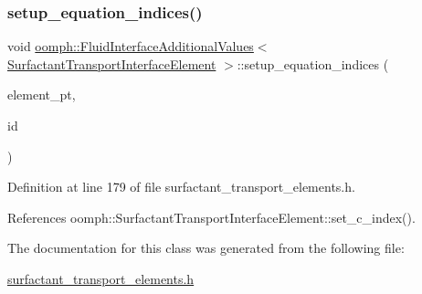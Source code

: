 \subsubsection{\texorpdfstring{setup\+\_\+equation\+\_\+indices()}{setup\_equation\_indices()}}
{\footnotesize\ttfamily void \hyperlink{classoomph_1_1FluidInterfaceAdditionalValues}{oomph\+::\+Fluid\+Interface\+Additional\+Values}$<$ \hyperlink{classoomph_1_1SurfactantTransportInterfaceElement}{Surfactant\+Transport\+Interface\+Element} $>$\+::setup\+\_\+equation\+\_\+indices (\begin{DoxyParamCaption}\item[{\hyperlink{classoomph_1_1SurfactantTransportInterfaceElement}{Surfactant\+Transport\+Interface\+Element} $\ast$const \&}]{element\+\_\+pt,  }\item[{const unsigned \&}]{id }\end{DoxyParamCaption})\hspace{0.3cm}{\ttfamily [inline]}}



Definition at line 179 of file surfactant\+\_\+transport\+\_\+elements.\+h.



References oomph\+::\+Surfactant\+Transport\+Interface\+Element\+::set\+\_\+c\+\_\+index().



The documentation for this class was generated from the following file\+:\begin{DoxyCompactItemize}
\item 
\hyperlink{surfactant__transport__elements_8h}{surfactant\+\_\+transport\+\_\+elements.\+h}\end{DoxyCompactItemize}
